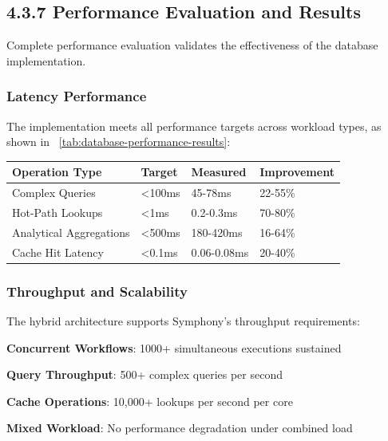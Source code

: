 \subsection*{4.3.7 Performance Evaluation and Results}

Complete performance evaluation validates the effectiveness of the database implementation.

\subsubsection*{Latency Performance}

The implementation meets all performance targets across workload types, as shown in ~\ref{tab:database-performance-results}:

\begin{center}
\begin{tabular}{@{}llll@{}}
\toprule
\textbf{Operation Type} & \textbf{Target} & \textbf{Measured} & \textbf{Improvement} \\
\midrule
Complex Queries & <100ms & 45-78ms & 22-55\% \\
Hot-Path Lookups & <1ms & 0.2-0.3ms & 70-80\% \\
Analytical Aggregations & <500ms & 180-420ms & 16-64\% \\
Cache Hit Latency & <0.1ms & 0.06-0.08ms & 20-40\% \\
\bottomrule
\end{tabular}
\label{tab:database-performance-results}
\end{center}

\subsubsection*{Throughput and Scalability}

The hybrid architecture supports Symphony's throughput requirements:

\begin{compactlist}
    \item \textbf{Concurrent Workflows}: 1000+ simultaneous executions sustained
    \item \textbf{Query Throughput}: 500+ complex queries per second
    \item \textbf{Cache Operations}: 10,000+ lookups per second per core
    \item \textbf{Mixed Workload}: No performance degradation under combined load
\end{compactlist}


